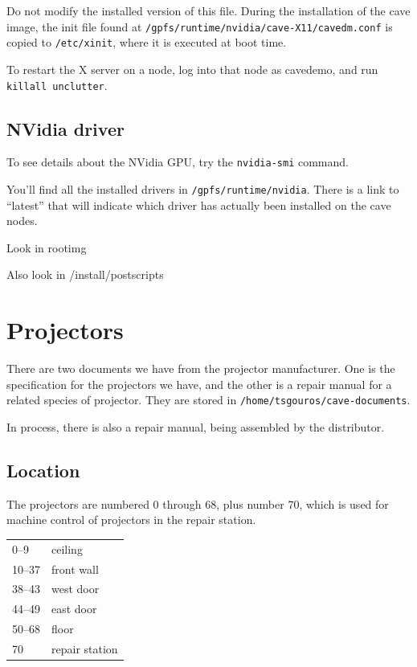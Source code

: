 \documentclass[11pt]{article}
\begin{document}
Do not modify the installed version of this file.  During the
installation of the cave image, the init file found at
\texttt{/gpfs/runtime/nvidia/cave-X11/cavedm.conf} is copied to
\texttt{/etc/xinit}, where it is executed at boot time.


To restart the X server on a node, log into that node as cavedemo, and
run \texttt{killall unclutter}.


\subsection{NVidia driver}

To see details about the NVidia GPU, try the \texttt{nvidia-smi} command.

You'll find all the installed drivers in
\texttt{/gpfs/runtime/nvidia}.  There is a link to ``latest'' that
will indicate which driver has actually been installed on the cave nodes.



Look in rootimg


Also look in /install/postscripts


\section{Projectors}

There are two documents we have from the projector manufacturer.  One
is the specification for the projectors we have, and the other is a
repair manual for a related species of projector.  They are stored in
\texttt{/home/tsgouros/cave-documents}.

In process, there is also a repair manual, being assembled by the
distributor.


\subsection{Location}

The projectors are numbered 0 through 68, plus number 70, which is
used for machine control of projectors in the repair station.

\begin{center}
\begin{tabular}{ll}
0--9 & ceiling \\
10--37 & front wall \\
38--43 & west door \\
44--49 & east door \\
50--68 & floor \\
70 & repair station
\end{tabular}
\end{center}
\end{document}
